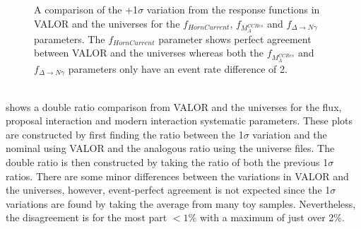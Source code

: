 \begin{figure}[h!]
  \captionsetup{width=0.49\textwidth}
  \parbox[b]{0.49\textwidth}%
  {
   \caption[+1$\sigma$ variation comparison for the $f_{HornCurrent}$, $f_{M_A^{CCRes}}$ and $f_{\Delta \rightarrow N \gamma}$ parameters.]{A comparison of the +1$\sigma$ variation from the response functions in VALOR and the universes for the $f_{HornCurrent}$, $f_{M_A^{CCRes}}$ and $f_{\Delta \rightarrow N \gamma}$ parameters. The $f_{HornCurrent}$ parameter shows perfect agreement between VALOR and the universes whereas both the $f_{M_A^{CCRes}}$ and $f_{\Delta \rightarrow N \gamma}$ parameters only have an event rate difference of 2. \\\phantom{.}\\
   \label{fig:+1sigma_variations}}
   }
\end{figure}

 shows a double ratio comparison from VALOR and the universes for the flux, proposal interaction and modern interaction systematic parameters. These plots are constructed by first finding the ratio between the 1$\sigma$ variation and the nominal using VALOR and the analogous ratio using the universe files. The double ratio is then constructed by taking the ratio of both the previous 1$\sigma$ ratios. There are some minor differences between the variations in VALOR and the universes, however, event-perfect agreement is not expected since the 1$\sigma$ variations are found by taking the average from many toy samples. Nevertheless, the disagreement is for the most part $< 1\%$ with a maximum of just over 2\%. 



